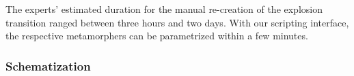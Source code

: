 The experts' estimated duration for the manual re-creation of the explosion transition ranged between three hours and two days. With our scripting interface, the respective metamorphers can be parametrized within a few minutes.




\subsubsection{Schematization}









